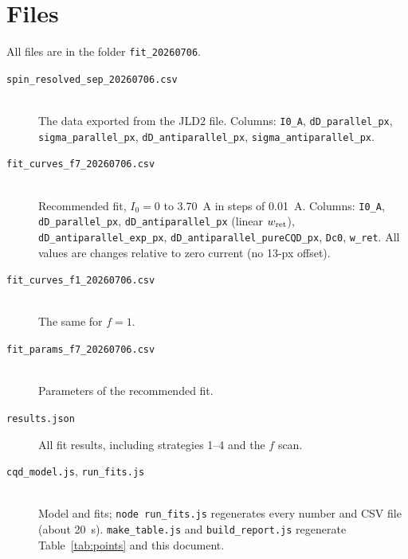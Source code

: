 \section{Files}
All files are in the folder \texttt{fit\_20260706}.
\begin{description}
\item[\texttt{spin\_resolved\_sep\_20260706.csv}] \mbox{}\\ The data exported from the JLD2 file.
Columns: \texttt{I0\_A}, \texttt{dD\_parallel\_px},\\ \texttt{sigma\_parallel\_px},
\texttt{dD\_antiparallel\_px}, \texttt{sigma\_antiparallel\_px}.
\item[\texttt{fit\_curves\_f7\_20260706.csv}] \mbox{}\\ Recommended fit, $I_0=0$ to 3.70~A in steps of 0.01~A.
Columns: \texttt{I0\_A}, \texttt{dD\_parallel\_px}, \texttt{dD\_antiparallel\_px} (linear $w_{\rm ret}$),\\
\texttt{dD\_antiparallel\_exp\_px}, \texttt{dD\_antiparallel\_pureCQD\_px}, \texttt{Dc0}, \texttt{w\_ret}.
All values are changes relative to zero current (no 13-px offset).
\item[\texttt{fit\_curves\_f1\_20260706.csv}] \mbox{}\\ The same for $f=1$.
\item[\texttt{fit\_params\_f7\_20260706.csv}] \mbox{}\\ Parameters of the recommended fit.
\item[\texttt{results.json}] All fit results, including strategies 1--4 and the $f$ scan.
\item[\texttt{cqd\_model.js}, \texttt{run\_fits.js}] \mbox{}\\ Model and fits; \texttt{node run\_fits.js}
regenerates every number and CSV file (about 20~s). \texttt{make\_table.js} and
\texttt{build\_report.js} regenerate Table~\ref{tab:points} and this document.
\end{description}


